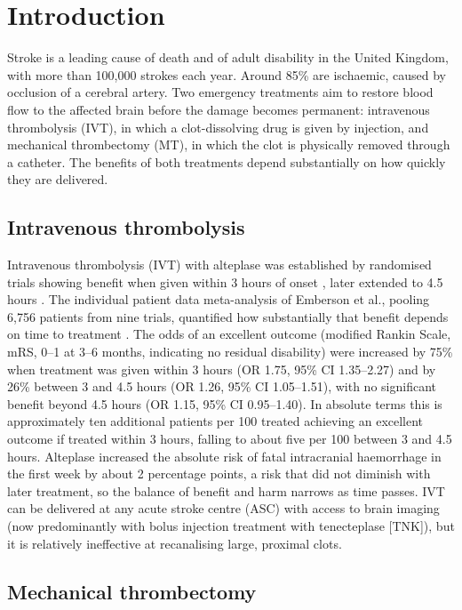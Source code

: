 \section{Introduction}

Stroke is a leading cause of death and of adult disability in the United Kingdom, with more than 100,000 strokes each year. Around 85\% are ischaemic, caused by occlusion of a cerebral artery. Two emergency treatments aim to restore blood flow to the affected brain before the damage becomes permanent: intravenous thrombolysis (IVT), in which a clot-dissolving drug is given by injection, and mechanical thrombectomy (MT), in which the clot is physically removed through a catheter. The benefits of both treatments depend substantially on how quickly they are delivered.

\subsection{Intravenous thrombolysis}

Intravenous thrombolysis (IVT) with alteplase was established by randomised trials showing benefit when given within 3 hours of onset \cite{ninds1995}, later extended to 4.5 hours \cite{hacke2008}. The individual patient data meta-analysis of Emberson et al., pooling 6{,}756 patients from nine trials, quantified how substantially that benefit depends on time to treatment \cite{emberson_effect_2014}. The odds of an excellent outcome (modified Rankin Scale, mRS, 0--1 at 3--6 months, indicating no residual disability) were increased by 75\% when treatment was given within 3 hours (OR 1.75, 95\% CI 1.35--2.27) and by 26\% between 3 and 4.5 hours (OR 1.26, 95\% CI 1.05--1.51), with no significant benefit beyond 4.5 hours (OR 1.15, 95\% CI 0.95--1.40). In absolute terms this is approximately ten additional patients per 100 treated achieving an excellent outcome if treated within 3 hours, falling to about five per 100 between 3 and 4.5 hours. Alteplase increased the absolute risk of fatal intracranial haemorrhage in the first week by about 2 percentage points, a risk that did not diminish with later treatment, so the balance of benefit and harm narrows as time passes. IVT can be delivered at any acute stroke centre (ASC) with access to brain imaging (now predominantly with bolus injection treatment with tenecteplase [TNK]), but it is relatively ineffective at recanalising large, proximal clots.

\subsection{Mechanical thrombectomy}

